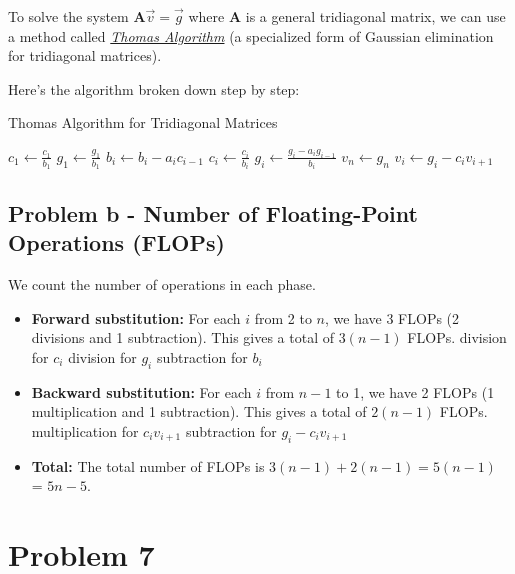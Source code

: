 \documentclass[english,notitlepage]{revtex4-1}  %
\begin{document}
To solve the system \( \mathbf{A} \vec{v} = \vec{g} \) where \( \mathbf{A} \) is a general tridiagonal matrix,
we can use a method called \textit{\href{https://en.wikipedia.org/wiki/Tridiagonal_matrix_algorithm}{Thomas Algorithm}}
(a specialized form of Gaussian elimination for tridiagonal matrices).


Here's the algorithm broken down step by step:

\begin{algorithm}[H]
    \caption{Thomas Algorithm for Tridiagonal Matrices}
    \begin{algorithmic}[1]
        \State \( c_1 \gets \frac{c_1}{b_1} \)
        \State \( g_1 \gets \frac{g_1}{b_1} \)
        \State \( b_i \gets b_i - a_i c_{i-1} \) 
        \State \( c_i \gets \frac{c_i}{b_i} \) 
        \EndIf
        \State \( g_i \gets \frac{g_i - a_i g_{i-1}}{b_i} \) 
        \EndFor
        \State \( v_n \gets g_n \) 
        \State \( v_i \gets g_i - c_i v_{i+1} \) 
        \EndFor
    \end{algorithmic}
\end{algorithm}

\subsection*{Problem b - Number of Floating-Point Operations (FLOPs)}

We count the number of operations in each phase.

\begin{itemize}
    \item \textbf{Forward substitution:} For each \( i \) from 2 to \( n \), we have 3 FLOPs (2 divisions and 1 subtraction). This gives a total of \( 3(n-1) \) FLOPs.
     division for \( c_i \)
     division for  \(g_i\)
     subtraction for \(b_i\)
    \item \textbf{Backward substitution:} For each \( i \) from \( n-1 \) to 1, we have 2 FLOPs (1 multiplication and 1 subtraction). This gives a total of \( 2(n-1) \) FLOPs.
     multiplication for \(c_i v_{i+1}\)
     subtraction for \(g_i - c_i v_{i+1}\)
    \item \textbf{Total:} The total number of FLOPs is \( 3(n-1) + 2(n-1) = 5(n-1) \) = \( 5n - 5 \).
\end{itemize}

\section*{Problem 7}
\end{document}
